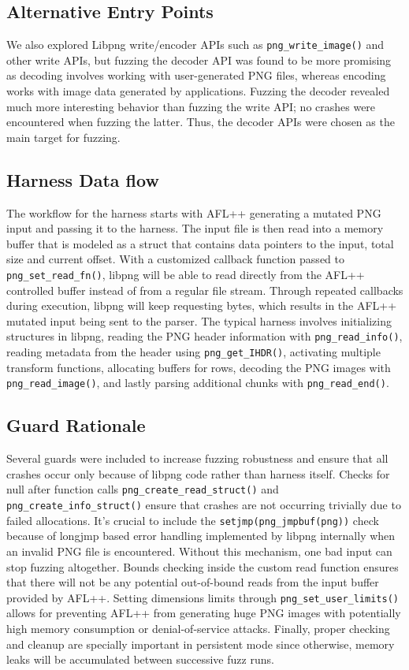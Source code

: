 \documentclass[letterpaper,twocolumn,10pt]{article}
\begin{document}
\subsection{Alternative Entry Points}
We also explored Libpng write/encoder APIs such as \texttt{png\_write\_image()} and other write APIs,  but fuzzing the decoder API was found to be more promising as decoding involves working with user-generated PNG files, whereas encoding works with image data generated by applications. Fuzzing the decoder revealed much more interesting behavior than fuzzing the write API; no crashes were encountered when fuzzing the latter. Thus, the decoder APIs were chosen as the main target for fuzzing.
\subsection{Harness Data flow}
The workflow for the harness starts with AFL++ generating a mutated PNG input and passing it to the harness. The input file is then read into a memory buffer that is modeled as a struct that contains data pointers to the input, total size and current offset. With a customized callback function passed to \texttt{png\_set\_read\_fn()}, libpng will be able to read directly from the AFL++ controlled buffer instead of from a regular file stream. Through repeated callbacks during execution, libpng will keep requesting bytes, which results in the AFL++ mutated input being sent to the parser. The typical harness involves initializing structures in libpng, reading the PNG header information with \texttt{png\_read\_info()}, reading metadata from the header using \texttt{png\_get\_IHDR()}, activating multiple transform functions, allocating buffers for rows, decoding the PNG images with \texttt{png\_read\_image()}, and lastly parsing additional chunks with \texttt{png\_read\_end()}.

\subsection{Guard Rationale}

Several guards were included to increase fuzzing robustness and ensure that all crashes occur only because of libpng code rather than harness itself. Checks for null after function calls \texttt{png\_create\_read\_struct()} and \texttt{png\_create\_info\_struct()} ensure that crashes are not occurring trivially due to failed allocations. It's crucial to include the \texttt {setjmp(png\_jmpbuf(png))} check because of longjmp based error handling implemented by libpng internally when an invalid PNG file is encountered. Without this mechanism, one bad input can stop fuzzing altogether. Bounds checking inside the custom read function ensures that there will not be any potential out-of-bound reads from the input buffer provided by AFL++. Setting dimensions limits through \texttt{png\_set\_user\_limits()} allows for preventing AFL++ from generating huge PNG images with potentially high memory consumption or denial-of-service attacks. Finally, proper checking and cleanup are specially important in persistent mode since otherwise, memory leaks will be accumulated between successive fuzz runs.
\end{document}
